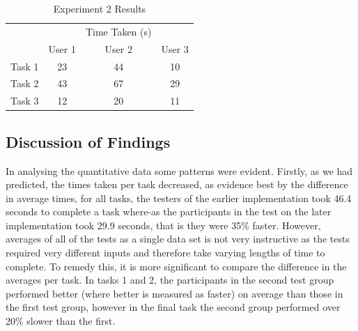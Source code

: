 \documentclass[10pt,a4paper]{article}
\begin{document}
\begin{table}[H]
\centering
\begin{tabular}{c|ccc|}
\cline{2-4}
                             &                             & Time Taken (s)              &        \\ \cline{2-4} 
                             & \multicolumn{1}{c|}{User 1} & \multicolumn{1}{c|}{User 2} & User 3 \\ \hline
\multicolumn{1}{|c|}{Task 1} & \multicolumn{1}{c|}{23}       & \multicolumn{1}{c|}{44}       &  10      \\ \hline
\multicolumn{1}{|c|}{Task 2} & \multicolumn{1}{c|}{43}       & \multicolumn{1}{c|}{67}       &    29    \\ \hline
\multicolumn{1}{|c|}{Task 3} & \multicolumn{1}{c|}{12}       & \multicolumn{1}{c|}{20}       &    11    \\ \hline
\end{tabular}
\caption{Experiment 2 Results \label{table:experiment-2}}
\end{table}

\subsection*{Discussion of Findings}

In analysing the quantitative data some patterns were evident. Firstly, as we had predicted, the times taken per task decreased, as evidence best by the difference in average times, for all tasks, the testers of the earlier implementation took 46.4 seconds to complete a task where-as the participants in the test on the later implementation took 29.9 seconds, that is they were 35\% faster. However, averages of all of the tests as a single data set is not very instructive as the tests required very different inputs and therefore take varying lengths of time to complete. To remedy this, it is more significant to compare the difference in the averages per task. In tasks 1 and 2, the participants in the second test group performed better (where better is measured as faster) on average than those in the first test group, however in the final task the second group performed over 20\% slower than the first. 
\end{document}
